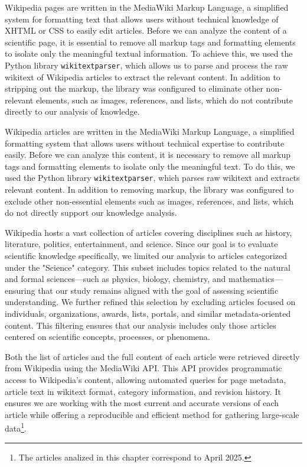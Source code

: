 Wikipedia pages are written in the MediaWiki Markup Language, a simplified system for formatting text that allows users without technical knowledge of XHTML or CSS to easily edit articles. Before we can analyze the content of a scientific page, it is essential to remove all markup tags and formatting elements to isolate only the meaningful textual information.  To achieve this, we used the Python library \texttt{wikitextparser}, which allows us to parse and process the raw wikitext of Wikipedia articles to extract the relevant content. In addition to stripping out the markup, the library was configured to eliminate other non-relevant elements, such as images, references, and lists, which do not contribute directly to our analysis of knowledge.

Wikipedia articles are written in the MediaWiki Markup Language, a simplified formatting system that allows users without technical expertise to contribute easily. Before we can analyze this content, it is necessary to remove all markup tags and formatting elements to isolate only the meaningful text. To do this, we used the Python library \texttt{wikitextparser}, which parses raw wikitext and extracts relevant content. In addition to removing markup, the library was configured to exclude other non-essential elements such as images, references, and lists, which do not directly support our knowledge analysis.

Wikipedia hosts a vast collection of articles covering disciplines such as history, literature, politics, entertainment, and science. Since our goal is to evaluate scientific knowledge specifically, we limited our analysis to articles categorized under the "Science" category. This subset includes topics related to the natural and formal sciences—such as physics, biology, chemistry, and mathematics—ensuring that our study remains aligned with the goal of assessing scientific understanding. We further refined this selection by excluding articles focused on individuals, organizations, awards, lists, portals, and similar metadata-oriented content. This filtering ensures that our analysis includes only those articles centered on scientific concepts, processes, or phenomena.

Both the list of articles and the full content of each article were retrieved directly from Wikipedia using the MediaWiki API. This API provides programmatic access to Wikipedia's content, allowing automated queries for page metadata, article text in wikitext format, category information, and revision history. It ensures we are working with the most current and accurate versions of each article while offering a reproducible and efficient method for gathering large-scale data\footnote{The articles analized in this chapter correspond to April 2025.}.

